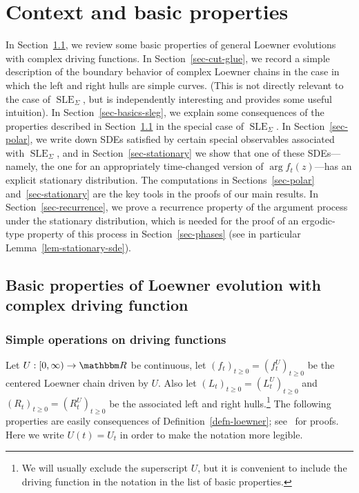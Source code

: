 \documentclass[11pt]{article}
\theoremstyle{plain}
\theoremstyle{definition}
\numberwithin{equation}{section}
\newcommand{\BB}{\mathbbm}
\newcommand{\op}{\operatorname}
\newcommand{\rta}{\rightarrow}
\newcommand{\SLEG}{{\operatorname{SLE}}_\Sigma}
\begin{document}
\section{Context and basic properties}
\label{sec-basics}

 
In Section~\ref{sec-complex-loewner}, we  review some basic properties of general Loewner evolutions with complex driving functions. 
In Section~\ref{sec-cut-glue}, we record a simple description of the boundary behavior of complex Loewner chains in the case in which the left and right hulls are simple curves. (This is not directly relevant to the case of $\SLEG$, but is independently interesting and provides some useful intuition). 
In Section~\ref{sec-basics-sleg}, we   explain some consequences of the properties described in Section~\ref{sec-complex-loewner} in the special case of $\SLEG$. 
In Section~\ref{sec-polar}, we   write down SDEs satisfied by certain special observables associated with $\SLEG$, and in Section~\ref{sec-stationary} we   show that one of these SDEs---namely, the one for an appropriately time-changed version of $\op{arg} f_t(z)$---has an explicit stationary distribution. 
The computations in Sections~\ref{sec-polar} and~\ref{sec-stationary} are the key tools in the proofs of our main results.
In Section~\ref{sec-recurrence}, we prove a recurrence property of the argument process under the stationary distribution, which is needed for the proof of an ergodic-type property of this process in Section~\ref{sec-phases} (see in particular Lemma~\ref{lem-stationary-sde}).

\subsection{Basic properties of Loewner evolution with complex driving function}
\label{sec-complex-loewner}

\subsubsection{Simple operations on driving functions}

Let $U : [0,\infty)\rta \BB R$ be continuous, let $(f_t)_{t\geq 0} = (f_t^U)_{t\geq 0}$ be the centered Loewner chain driven by $U$.
Also let $(L_t)_{t\geq0 } = (L_t^U)_{t\geq 0}$ and $(R_t)_{t\geq 0} = (R_t^U)_{t\geq 0}$ be the associated left and right hulls.\footnote{We will usually exclude the superscript $U$, but it is convenient to include the driving function in the notation in the list of basic properties.}
The following properties are easily consequences of Definition~\ref{defn-loewner}; see~\cite[Section 2]{lu-complex-loewner} for proofs. Here we write $U(t) = U_t$ in order to make the notation more legible.
\end{document}
